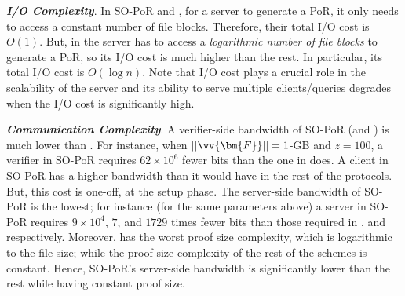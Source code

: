 \noindent\textbf{\textit{I/O Complexity}}. In SO-PoR and \cite{xu2016lightweight,armknecht2014outsourced}, for a server to generate a PoR, it only needs to access a constant number of file blocks. Therefore, their total I/O cost is $O(1)$. But,  in \cite{Storage-Time}  the server has to access a \emph{logarithmic number of file blocks} to generate a PoR, so its I/O cost is much higher than the rest. In particular, its total I/O cost is $O(\log n)$. Note that I/O cost plays a crucial role in the scalability of the server and its ability to serve multiple clients/queries degrades when the I/O cost is significantly high. 



 \noindent\textbf{\textit{Communication Complexity}}. A verifier-side bandwidth of SO-PoR (and \cite{xu2016lightweight,Storage-Time}) is much lower than \cite{armknecht2014outsourced}. For instance, when $||\vv{\bm{F}}||=1$-GB and $z=100$, a verifier in SO-PoR requires $62\times 10^{\scriptscriptstyle 6}$  fewer bits than the one in \cite{armknecht2014outsourced} does. A client in SO-PoR has a higher bandwidth than it would have in the rest of the protocols. But, this cost is one-off, at the setup phase.  The server-side bandwidth of SO-PoR is the lowest;  for instance (for the same parameters above) a server in SO-PoR requires $9\times 10^{\scriptscriptstyle4}$,  $7$, and $1729$ times fewer bits  than those required in \cite{armknecht2014outsourced}, \cite{xu2016lightweight} and \cite{Storage-Time} respectively.   Moreover, \cite{Storage-Time} has the worst proof size complexity, which is logarithmic to the file size; while the proof size complexity of the rest of the schemes  is constant.  Hence, SO-PoR's server-side bandwidth is significantly lower than the rest  while having constant proof size. 
